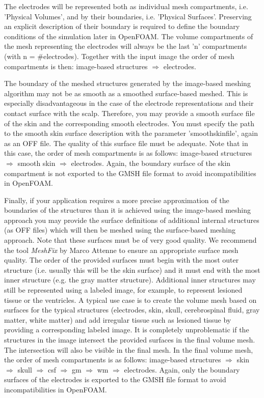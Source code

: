 The electrodes will be represented both as individual mesh compartments, i.e. 'Physical Volumes', and by
their boundaries, i.e. 'Physical Surfaces'. Preserving an explicit description of their boundary is required
to define the boundary conditions of the simulation later in OpenFOAM. The volume compartments of the mesh
representing the electrodes will always be the last 'n' compartments (with n = \#electrodes). Together with
the input image the order of mesh compartments is then: image-based structures $\Rightarrow$ electrodes.\par
The boundary of the meshed structures generated by the image-based meshing algorithm may not be as smooth as
a smoothed surface-based meshed. This is especially disadvantageous in the case of the electrode representations
and their contact surface with the scalp. Therefore, you may provide a smooth surface file of the skin and the
corresponding smooth electrodes. You must specify the path to the smooth skin surface description with the parameter
'smoothskinfile', again as an OFF file. The quality of this surface file must be adequate. Note that in
this case, the order of mesh compartments is as follows: image-based structures $\Rightarrow$ smooth
skin $\Rightarrow$ electrodes. Again, the boundary surface of the skin compartment is not exported to the
GMSH file format to avoid incompatibilities in OpenFOAM.\par
Finally, if your application requires a more precise approximation of the boundaries of the structures than
it is achieved using the image-based meshing approach you may provide the surface definitions of additional
internal structures (as OFF files) which will then be meshed using the surface-based meshing approach. Note
that these surfaces must be of very good quality. We recommend the tool \emph{MeshFix} by Marco Attenne
\cite{attene2010lightweight} to ensure an appropriate surface mesh quality. The order of the provided surfaces
must begin with the most outer structure (i.e. usually this will be the skin surface) and it must end with
the most inner structure (e.g. the gray matter structure). Additional inner structures may still be represented
using a labeled image, for example, to represent lesioned tissue or the ventricles. A typical use case is to
create the volume mesh based on surfaces for the typical structures (electrodes, skin, skull, cerebrospinal
fluid, gray matter, white matter) and add irregular tissue such as lesioned tissue by providing a corresponding
labeled image. It is completely unproblematic if the structures in the image intersect the provided surfaces
in the final volume mesh. The intersection will also be visible in the final mesh. In the final volume mesh,
the order of mesh compartments is as follows: image-based structures $\Rightarrow$ skin $\Rightarrow$ skull
$\Rightarrow$ csf $\Rightarrow$ gm $\Rightarrow$ wm $\Rightarrow$ electrodes. Again, only the boundary surfaces
of the electrodes is exported to the GMSH file format to avoid incompatibilities in OpenFOAM.\par

